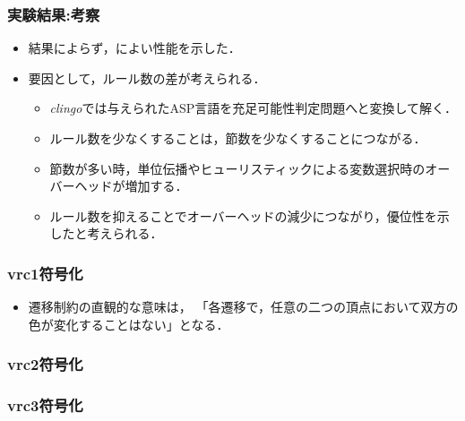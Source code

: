 
\begin{frame}\frametitle{実験結果:考察}

  \begin{itemize}
    \item 結果によらず，によい性能を示した．
    \item 要因として，\alert{ルール数の差}が考えられる．
    \begin{itemize}
      \item \textit{clingo}では与えられたASP言語を充足可能性判定問題へと変換して解く．
      \item ルール数を少なくすることは，節数を少なくすることにつながる．
      \item 節数が多い時，単位伝播やヒューリスティックによる変数選択時のオーバーヘッドが増加する．
      \item ルール数を抑えることでオーバーヘッドの減少につながり，優位性を示したと考えられる．
    \end{itemize}
  \end{itemize}
  
\end{frame}


\begin{frame}\frametitle{vrc1符号化}
  \begin{exampleblock}{}\centering
     
   \end{exampleblock}

   \begin{itemize}
     \item 遷移制約の直観的な意味は，
    「各遷移で，任意の二つの頂点において双方の色が変化することはない」となる．
   \end{itemize}
\end{frame}


\begin{frame}\frametitle{vrc2符号化}
  \begin{exampleblock}{}\centering
     
   \end{exampleblock}
\end{frame}


\begin{frame}\frametitle{vrc3符号化}
  \begin{exampleblock}{}\centering
     
   \end{exampleblock}
\end{frame}

\backupend